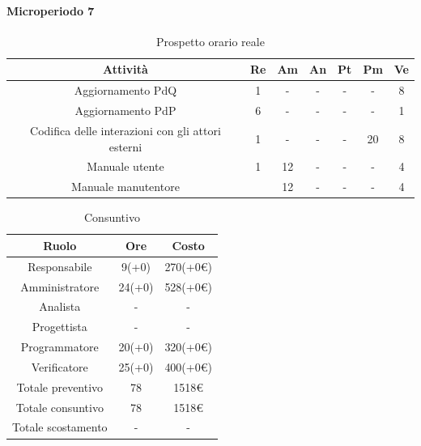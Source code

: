 \paragraph{Microperiodo 7}
\begin{table}[H]
	\centering
	\begin{tabular}{|c|c|c|c|c|c|c|}
		\hline
		\rowcolor{lighter-grayer}
		\textbf{Attività} & \textbf{Re}        & \textbf{Am}        & \textbf{An}        & \textbf{Pt}        & \textbf{Pm}        & \textbf{Ve}        \\ \hline
		
		Aggiornamento PdQ   & 1 & -  & - & - & - & 8 \\ \hline
		Aggiornamento PdP   & 6 & -  & - & - & - & 1 \\ \hline
		Codifica delle interazioni con gli attori esterni & 1           & -           & -           & -           & 20          & 8           \\ \hline
		Manuale utente      & 1 & 12 & - & - & - & 4 \\ \hline
		Manuale manutentore &   & 12 & - & - & - & 4 \\ \hline
	
	\end{tabular}
	\caption{ Prospetto orario reale\\}
\end{table}

\begin{table}[H]
	\centering
	\renewcommand{\arraystretch}{1.5}
	\begin{tabular}{|c|c|c|}
		\hline
		\rowcolor{lighter-grayer}
		Ruolo & Ore & Costo \\ \hline
		Responsabile & 9(+0) & 270(+0\euro) \\ \hline
		Amministratore & 24(+0) & 528(+0\euro) \\ \hline
		Analista & - & - \\ \hline
		Progettista & - & - \\ \hline
		Programmatore & 20(+0) & 320(+0\euro) \\ \hline
		Verificatore & 25(+0) & 400(+0\euro) \\ \hline
		Totale preventivo & 78 & 1518\euro \\ \hline
		Totale consuntivo & 78 & 1518\euro \\ \hline
		Totale scostamento & - & - \\ \hline
	\end{tabular}
	\caption{ Consuntivo\\}
\end{table}

